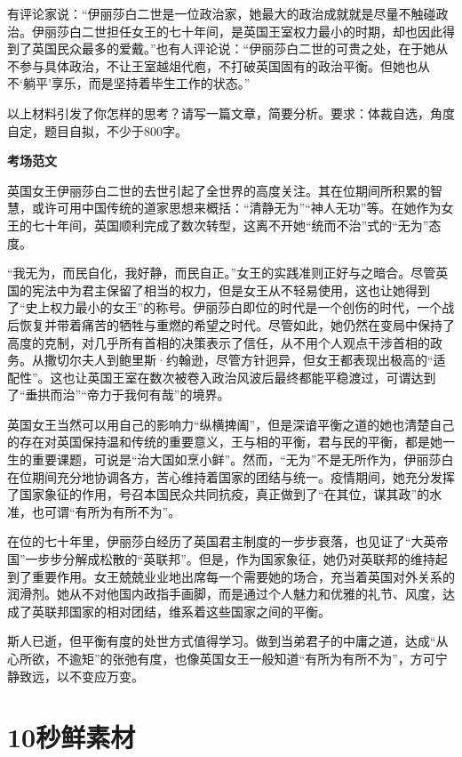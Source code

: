 有评论家说：“伊丽莎白二世是一位政治家，她最大的政治成就就是尽量不触碰政治。伊丽莎白二世担任女王的七十年间，是英国王室权力最小的时期，却也因此得到了英国民众最多的爱戴。”也有人评论说：“伊丽莎白二世的可贵之处，在于她从不参与具体政治，不让王室越俎代庖，不打破英国固有的政治平衡。但她也从不‘躺平’享乐，而是坚持着毕生工作的状态。”

以上材料引发了你怎样的思考？请写一篇文章，简要分析。要求：体裁自选，角度自定，题目自拟，不少于800字。

\textbf{考场范文}

英国女王伊丽莎白二世的去世引起了全世界的高度关注。其在位期间所积累的智慧，或许可用中国传统的道家思想来概括：“清静无为”“神人无功”等。在她作为女王的七十年间，英国顺利完成了数次转型，这离不开她“统而不治”式的“无为”态度。

“我无为，而民自化，我好静，而民自正。”女王的实践准则正好与之暗合。尽管英国的宪法中为君主保留了相当的权力，但是女王从不轻易使用，这也让她得到了“史上权力最小的女王”的称号。伊丽莎白即位的时代是一个创伤的时代，一个战后恢复并带着痛苦的牺牲与重燃的希望之时代。尽管如此，她仍然在变局中保持了高度的克制，对几乎所有首相的决策表示了信任，从不用个人观点干涉首相的政务。从撒切尔夫人到鲍里斯·约翰逊，尽管方针迥异，但女王都表现出极高的“适配性”。这也让英国王室在数次被卷入政治风波后最终都能平稳渡过，可谓达到了“垂拱而治”“帝力于我何有哉”的境界。

英国女王当然可以用自己的影响力“纵横捭阖”，但是深谙平衡之道的她也清楚自己的存在对英国保持温和传统的重要意义，王与相的平衡，君与民的平衡，都是她一生的重要课题，可说是“治大国如烹小鲜”。然而，“无为”不是无所作为，伊丽莎白在位期间充分地协调各方，苦心维持着国家的团结与统一。疫情期间，她充分发挥了国家象征的作用，号召本国民众共同抗疫，真正做到了“在其位，谋其政”的水准，也可谓“有所为有所不为”。

在位的七十年里，伊丽莎白经历了英国君主制度的一步步衰落，也见证了“大英帝国”一步步分解成松散的“英联邦”。但是，作为国家象征，她仍对英联邦的维持起到了重要作用。女王兢兢业业地出席每一个需要她的场合，充当着英国对外关系的润滑剂。她从不对他国内政指手画脚，而是通过个人魅力和优雅的礼节、风度，达成了英联邦国家的相对团结，维系着这些国家之间的平衡。

斯人已逝，但平衡有度的处世方式值得学习。做到当弟君子的中庸之道，达成“从心所欲，不逾矩”的张弛有度，也像英国女王一般知道“有所为有所不为”，方可宁静致远，以不变应万变。

\clearpage
\section*{10秒鲜素材}


